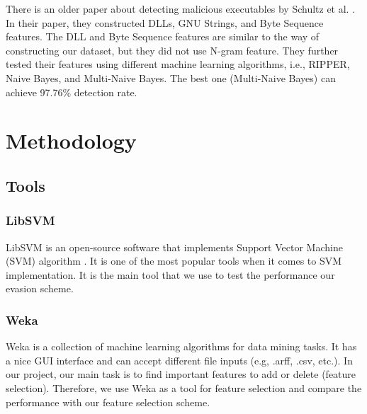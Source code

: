 \documentclass[11pt]{article}
\begin{document}
There is an older paper about detecting malicious executables by Schultz et al. \cite{schultz2001data}. In their paper, they constructed DLLs, GNU Strings, and Byte Sequence features. The DLL and Byte Sequence features are similar to the way of constructing our dataset, but they did not use N-gram feature. They further tested their features using different machine learning algorithms, i.e., RIPPER, Naive Bayes, and Multi-Naive Bayes. The best one (Multi-Naive Bayes) can achieve 97.76\% detection rate.




\section{Methodology}\label{sec:metho}

\subsection{Tools}
\subsubsection{LibSVM}
LibSVM \cite{CC01a} is an open-source software that implements Support Vector Machine (SVM) algorithm \cite{cortes1995support}. It is one of the most popular tools when it comes to SVM implementation. It is the main tool that we use to test the performance our evasion scheme. 

\subsubsection{Weka}
Weka \cite{hall2009weka} is a collection of machine learning algorithms for data mining tasks. It has a nice GUI interface and can accept different file inputs (e.g, .arff, .csv, etc.). In our project, our main task is to find important features to add or delete (feature selection). Therefore, we use Weka as a tool for feature selection and compare the performance with our feature selection scheme.
\end{document}
